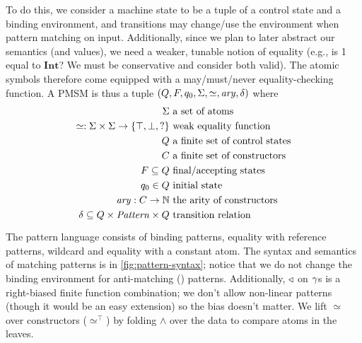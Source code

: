 \documentclass[preprint,onecolumn,9pt]{sigplanconf} %
\begin{document}
To do this, we consider a machine state to be a tuple of a control state and a binding environment, and transitions may change/use the environment when pattern matching on input.
%
Additionally, since we plan to later abstract our semantics (and values), we need a weaker, tunable notion of equality (e.g., is 1 equal to $\mathbf{Int}$? We must be conservative and consider both valid).
%
The atomic symbols therefore come equipped with a may/must/never equality-checking function.
%
A PMSM is thus a tuple $(Q, F, q_0, \Sigma, \simeq, \mathit{ary}, \delta)$ where
\begin{align*}
  \Sigma &\text{ a set of atoms} \\
  \simeq : \Sigma \times \Sigma \to \{\top, \bot, ?\} &\text{ weak equality function}\\
  Q &\text{ a finite set of control states} \\
  C &\text{ a finite set of constructors} \\
  F \subseteq Q &\text{ final/accepting states} \\
  q_0 \in Q &\text{ initial state} \\
  \mathit{ary} : C \to {\mathbb N}&\text{ the arity of constructors} \\
  \delta \subseteq Q \times \mathit{Pattern} \times Q & \text{ transition relation}\\[2pt]
\end{align*}
The pattern language consists of binding patterns, equality with reference patterns, wildcard and equality with a constant atom.
%
The syntax and semantics of matching patterns is in \autoref{fig:pattern-syntax}; notice that we do not change the binding environment for anti-matching ($\!$) patterns.
%
Additionally, $\triangleleft$ on $\gamma$s is a right-biased finite function combination; we don't allow non-linear patterns (though it would be an easy extension) so the bias doesn't matter.
%
We lift $\simeq$ over constructors ($\simeq^\top$) by folding $\wedge$ over the data to compare atoms in the leaves.
%
\end{document}

